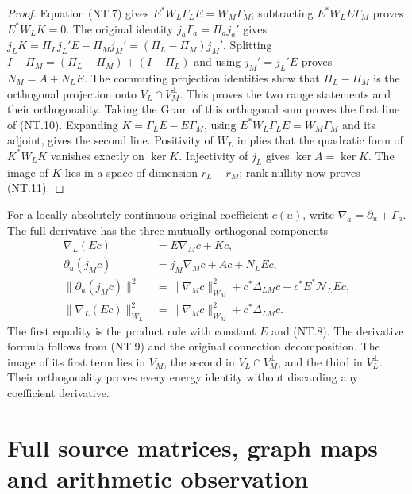 \documentclass[11pt]{article}
\begin{document}
\begin{proof}
Equation (NT.7) gives $E^*W_L\Gamma_LE=W_M\Gamma_M$;
subtracting $E^*W_LE\Gamma_M$ proves $E^*W_LK=0$.
The original identity $j_a\Gamma_a=\Pi_a j_a'$ gives
$j_LK=\Pi_Lj_L'E-\Pi_Mj_M'=(\Pi_L-\Pi_M)j_M'$.
Splitting $I-\Pi_M=(\Pi_L-\Pi_M)+(I-\Pi_L)$ and using
$j_M'=j_L'E$ proves $N_M=A+N_LE$.
The commuting projection identities show that $\Pi_L-\Pi_M$
is the orthogonal projection onto $V_L\cap V_M^\perp$.
This proves the two range statements and their orthogonality.
Taking the Gram of this orthogonal sum proves the first line of
(NT.10). Expanding $K=\Gamma_LE-E\Gamma_M$, using
$E^*W_L\Gamma_LE=W_M\Gamma_M$ and its adjoint, gives
the second line. Positivity of $W_L$ implies that the quadratic
form of $K^*W_LK$ vanishes exactly on $\ker K$.
Injectivity of $j_L$ gives $\ker A=\ker K$.
The image of $K$ lies in a space of dimension $r_L-r_M$;
rank-nullity now proves (NT.11).
\end{proof}

For a locally absolutely continuous original coefficient $c(u)$,
write $\nabla_a=\partial_u+\Gamma_a$. The full derivative has
the three mutually orthogonal components
\[
 \begin{aligned}
 \nabla_L(Ec)&=E\nabla_Mc+Kc,\\
 \partial_u(j_Mc)&=j_M\nabla_Mc+Ac+N_LEc,\\
 \|\partial_u(j_Mc)\|^2
 &=\|\nabla_Mc\|_{W_M}^2+c^*\Delta_{LM}c
                               +c^*E^*\mathcal N_LEc,\\
 \|\nabla_L(Ec)\|_{W_L}^2
 &=\|\nabla_Mc\|_{W_M}^2+c^*\Delta_{LM}c.
 \end{aligned}
 \tag{NT.12}
\]
The first equality is the product rule with constant $E$ and
(NT.8). The derivative formula follows from (NT.9) and the
original connection decomposition. The image of its first term
lies in $V_M$, the second in $V_L\cap V_M^\perp$, and the
third in $V_L^\perp$. Their orthogonality proves every energy
identity without discarding any coefficient derivative.

\section{Full source matrices, graph maps and arithmetic observation}
\end{document}
